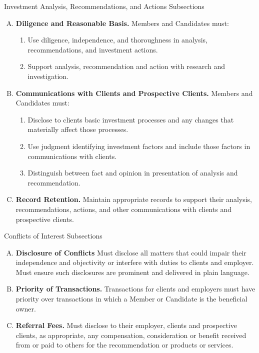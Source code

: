 \documentclass[../custom]{flashcards}
\begin{document}
\begin{flashcard}{Investment Analysis, Recommendations, and Actions Subsections}
    \begin{enumerate}[A.]
        \item \textbf{Diligence and Reasonable Basis.} Members and Candidates must:
            \begin{enumerate}[1.]
                \item Use diligence, independence, and thoroughness in analysis, recommendations, and investment actions.
                \item Support analysis, recommendation and action with research and investigation.
            \end{enumerate}
        \item \textbf{Communications with Clients and Prospective Clients.} Members and Candidates must:
            \begin{enumerate}[1.]
                \item Disclose to clients basic investment processes and any changes that materially affect those processes.
                \item Use judgment identifying investment factors and include those factors in communications with clients.
                \item Distinguish between fact and opinion in presentation of analysis and recommendation.
            \end{enumerate}
        \item \textbf{Record Retention.} Maintain appropriate records to support their analysis, recommendations, actions, and other communications with clients and prospective clients.
    \end{enumerate}
\end{flashcard}

\begin{flashcard}{Conflicts of Interest Subsections}
    \begin{enumerate}[A.]
        \item \textbf{Disclosure of Conflicts} Must disclose all matters that could impair their independence and objectivity or interfere with duties to clients and employer. Must ensure such disclosures are prominent and delivered in plain language.
        \item \textbf{Priority of Transactions.} Transactions for clients and employers must have priority over transactions in which a Member or Candidate is the beneficial owner.
        \item \textbf{Referral Fees.} Must disclose to their employer, clients and prospective clients, as appropriate, any compensation, consideration or benefit received from or paid to others for the recommendation or products or services.
    \end{enumerate}
\end{flashcard}
\end{document}
